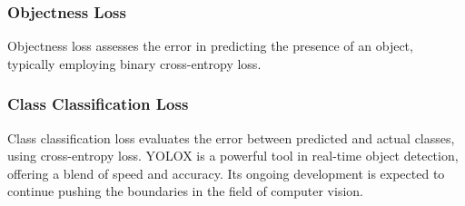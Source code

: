 \subsubsection{Objectness Loss}
\singlespacing
Objectness loss assesses the error in predicting the presence of an object, typically employing binary cross-entropy loss.

\subsubsection{Class Classification Loss}
\singlespacing
Class classification loss evaluates the error between predicted and actual classes, using cross-entropy loss.
\singlespacing
YOLOX is a powerful tool in real-time object detection, offering a blend of speed and accuracy. Its ongoing development is expected to continue pushing the boundaries in the field of computer vision.

